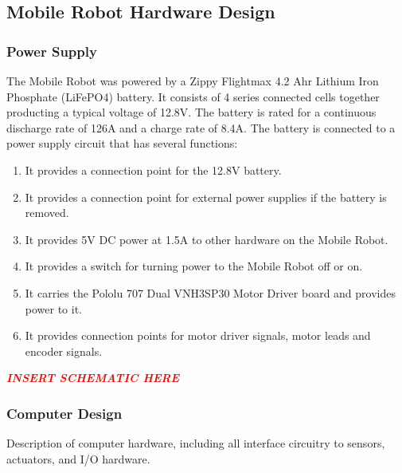 \documentclass[11pt,a4paper]{article}
\begin{document}
  \subsection{Mobile Robot Hardware Design}
    \subsubsection{Power Supply}
      The Mobile Robot was powered by a Zippy Flightmax 4.2 Ahr Lithium Iron Phosphate (LiFePO4) battery. It consists of 4 series connected cells together producting a typical voltage of 12.8V. The battery is rated for a continuous discharge rate of 126A and a charge rate of 8.4A. The battery is connected to a power supply circuit that has several functions:
      \begin{enumerate}
        \item It provides a connection point for the 12.8V battery.
        \item It provides a connection point for external power supplies if the battery is removed.
        \item It provides 5V DC power at 1.5A to other hardware on the Mobile Robot.
        \item It provides a switch for turning power to the Mobile Robot off or on.
        \item It carries the Pololu 707 Dual VNH3SP30 Motor Driver board and provides power to it.
        \item It provides connection points for motor driver signals, motor leads and encoder signals.
      \end{enumerate}
      \textcolor{red}
      {
      \textit{\textbf{INSERT SCHEMATIC HERE}}
      }
    \subsubsection{Computer Design}
    Description of computer hardware, including all interface circuitry to sensors, actuators, and I/O hardware.
\end{document}
